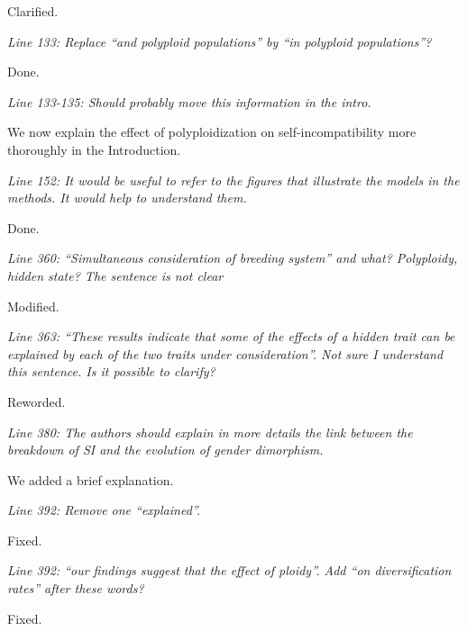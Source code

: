\documentclass[11pt]{article}
\renewenvironment{quote}{\bigskip\noindent\itshape\ignorespaces}{\smallskip}
\begin{document}
Clarified.


\begin{quote}
Line 133: Replace ``and polyploid populations'' by ``in polyploid populations''?
\end{quote}

Done.


\begin{quote}
Line 133-135: Should probably move this information in the intro.
\end{quote}

We now explain the effect of polyploidization on self-incompatibility more thoroughly in the Introduction.


\begin{quote}
Line 152: It would be useful to refer to the figures that illustrate the models in the methods.
It would help to understand them.
\end{quote}

Done. 


\begin{quote}
Line 360: ``Simultaneous consideration of breeding system'' and what?
Polyploidy, hidden state?
The sentence is not clear
\end{quote}

Modified.


\begin{quote}
Line 363: ``These results indicate that some of the effects of a hidden trait can be explained by each of the two traits under consideration''.
Not sure I understand this sentence. Is it possible to clarify?
\end{quote}

Reworded.


\begin{quote}
Line 380: The authors should explain in more details the link between the breakdown of SI and the evolution of gender dimorphism.
\end{quote}

We added a brief explanation.


\begin{quote}
Line 392: Remove one ``explained''.
\end{quote}

Fixed.


\begin{quote}
Line 392: ``our findings suggest that the effect of ploidy''.
Add ``on diversification rates'' after these words?
\end{quote}

Fixed.
\end{document}
